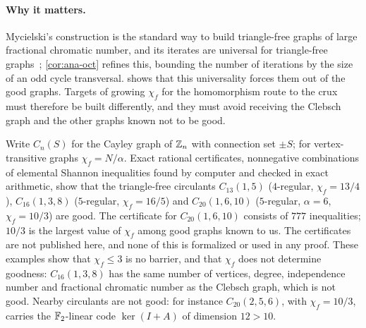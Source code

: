 \paragraph{Why it matters.} Mycielski's construction is the standard way to build triangle-free graphs of large
fractional chromatic number, and its iterates are universal for triangle-free graphs~\cite{CGL2006}; \cref{cor:ana-oct} refines this, bounding
the number of iterations by the size of an odd cycle transversal.
 shows that this universality forces them out of the good graphs. Targets of growing $\chi_f$ for the
homomorphism route to the crux must therefore be built differently, and they must avoid receiving the Clebsch graph and
the other graphs known not to be good.

\begin{remark}\label{rem:ana-circulants}
Write $C_n(S)$ for the Cayley graph of $\mathbb{Z}_n$ with connection set $\pm S$; for vertex-transitive graphs
$\chi_f=N/\alpha$. Exact rational certificates, nonnegative combinations of elemental Shannon inequalities found by
computer and checked in exact arithmetic, show that the triangle-free circulants
$C_{13}(1,5)$ ($4$-regular, $\chi_f=13/4$), $C_{16}(1,3,8)$ ($5$-regular, $\chi_f=16/5$) and $C_{20}(1,6,10)$
($5$-regular, $\alpha=6$, $\chi_f=10/3$) are good. The certificate for $C_{20}(1,6,10)$ consists of $777$ inequalities;
$10/3$ is the largest value of $\chi_f$ among good graphs known to us. The certificates are not published here, and none
of this is formalized or used in any proof. These examples show that $\chi_f\le3$ is no barrier, and that $\chi_f$ does not
determine goodness: $C_{16}(1,3,8)$ has the same number of vertices, degree, independence number and fractional
chromatic number as the Clebsch graph, which is not good. Nearby circulants are not good: for instance
$C_{20}(2,5,6)$, with $\chi_f=10/3$, carries the $\mathbb{F}_2$-linear code $\ker(I+A)$ of dimension $12>10$.
\end{remark}

